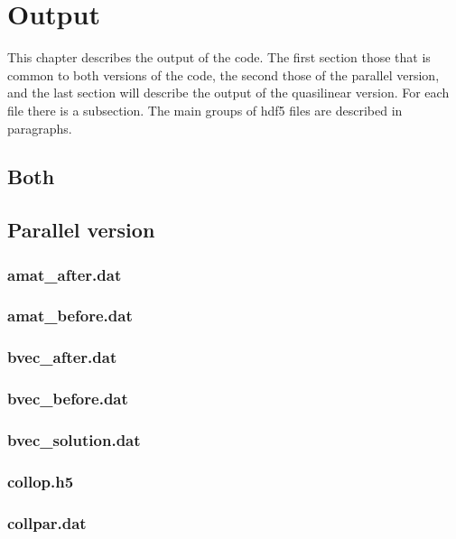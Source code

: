 \chapter{Output}
This chapter describes the output of the code.
The first section those that is common to both versions of the code, the
second those of the parallel version, and the last section will describe
the output of the quasilinear version.
For each file there is a subsection. The main groups of hdf5 files are
described in paragraphs.

\section{Both}

\section{Parallel version}

\subsection{amat\_after.dat}
\subsection{amat\_before.dat}

\subsection{bvec\_after.dat}
\subsection{bvec\_before.dat}
\subsection{bvec\_solution.dat}
\subsection{collop.h5}
\subsection{collpar.dat}

